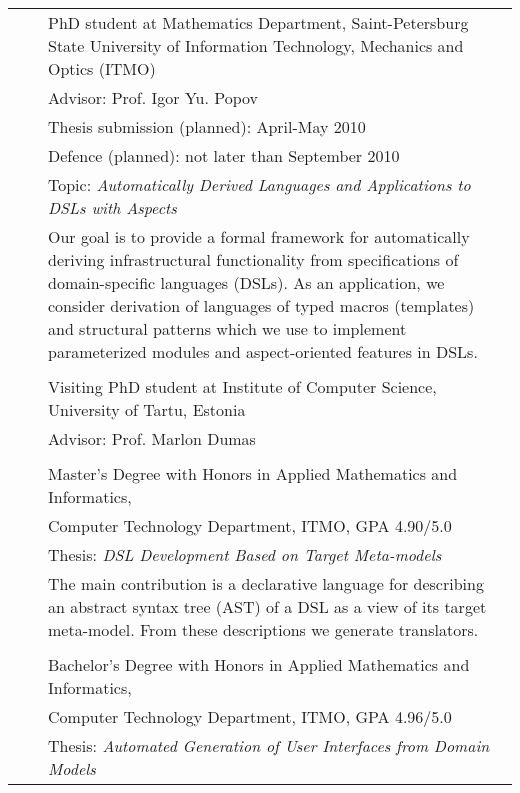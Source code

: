\documentclass[a4paper, 12pt]{article}
\begin{document}
\begin{tabular*}{1.0\textwidth}[t]{p{70pt} l p{370pt}}
	\raggedleft{since 2007}&\hspace{10pt}&PhD student at Mathematics Department, Saint-Petersburg State University of Information Technology, Mechanics and Optics (ITMO)\\
	&&Advisor: Prof. Igor Yu. Popov \\
	&&Thesis submission (planned): April-May 2010\\
	&&Defence (planned): not later than September 2010\\
	&&Topic: \textit{Automatically Derived Languages and Applications to DSLs with Aspects}\\
	&&Our goal is to provide a formal framework for automatically deriving infrastructural functionality 
	  from specifications of domain-specific languages (DSLs).
	  As an application, we consider derivation of languages of typed macros (templates) and structural patterns
	  which we use to implement parameterized modules and aspect-oriented features in DSLs. \\
	&&\\
	\raggedleft{2009 -- 2010}&& Visiting PhD student at Institute of Computer Science, University of Tartu, Estonia\\
	&&Advisor: Prof. Marlon Dumas \\
	&&\\
	\raggedleft{2007} && Master's Degree with Honors in Applied Mathematics and Informatics, \\
	&&Computer Technology Department, ITMO, GPA 4.90/5.0\\
	&&Thesis: \textit{DSL Development Based on Target Meta-models}\\
	&&The main contribution is a declarative language for describing an abstract syntax tree (AST) of a 
	  DSL as a view of its target meta-model. From these descriptions we generate translators. \\
	&&\\
	\raggedleft{2005} && Bachelor's Degree with Honors in Applied Mathematics and Informatics, \\
	&&Computer Technology Department, ITMO, GPA 4.96/5.0\\
	&&Thesis: \textit{Automated Generation of User Interfaces from Domain Models}\\
\end{tabular*}
\end{document}
